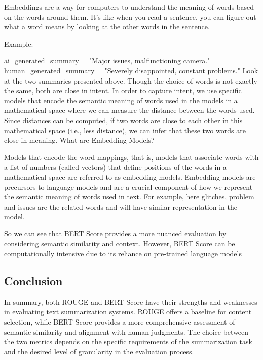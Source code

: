 Embeddings are a way for computers to understand the meaning of words based on the words around them. It's like when you read a sentence, you can figure out what a word means by looking at the other words in the sentence.

Example:

ai\_generated\_summary = "Major issues, malfunctioning camera."
human\_generated\_summary = "Severely disappointed, constant problems."
Look at the two summaries presented above. Though the choice of words is not exactly the same, both are close in intent.
In order to capture intent, we use specific models that encode the semantic meaning of words used in the models in a mathematical space where we can measure the distance between the words used.
Since distances can be computed, if two words are close to each other in this mathematical space (i.e., less distance), we can infer that these two words are close in meaning.
What are Embedding Models?

Models that encode the word mappings, that is, models that associate words with a list of numbers (called vectors) that define positions of the words in a mathematical space are referred to as embedding models. 
Embedding models are precursors to language models and are a crucial component of how we represent the semantic meaning of words used in text. For example, here glitches, problem and issues are the related words and will have similar representation in the model. 


So we can see that BERT Score provides a more nuanced evaluation by considering semantic similarity and context. However, BERT Score can be computationally intensive due to its reliance on pre-trained language models

\subsection{Conclusion}
In summary, both ROUGE and BERT Score have their strengths and weaknesses in evaluating text summarization systems. ROUGE offers a baseline for content selection, while BERT Score provides a more comprehensive assessment of semantic similarity and alignment with human judgments. The choice between the two metrics depends on the specific requirements of the summarization task and the desired level of granularity in the evaluation process. 